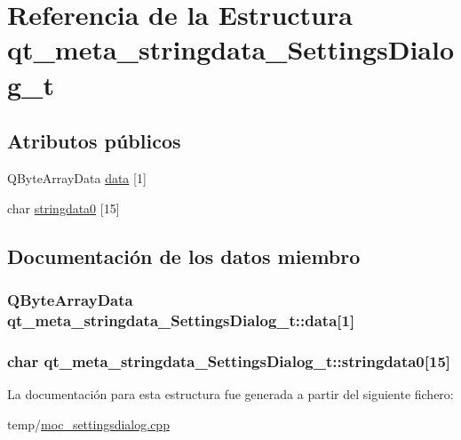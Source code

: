 \hypertarget{structqt__meta__stringdata___settings_dialog__t}{}\section{Referencia de la Estructura qt\+\_\+meta\+\_\+stringdata\+\_\+\+Settings\+Dialog\+\_\+t}
\label{structqt__meta__stringdata___settings_dialog__t}
\subsection*{Atributos públicos}
\begin{DoxyCompactItemize}
\item 
Q\+Byte\+Array\+Data \hyperlink{structqt__meta__stringdata___settings_dialog__t_acd19f421b45861ccbd792760ab6da612}{data} \mbox{[}1\mbox{]}
\item 
char \hyperlink{structqt__meta__stringdata___settings_dialog__t_ae8af4902fefe5a4bfd6e82a2d58d6f45}{stringdata0} \mbox{[}15\mbox{]}
\end{DoxyCompactItemize}


\subsection{Documentación de los datos miembro}
\subsubsection[{\texorpdfstring{data}{data}}]{\setlength{\rightskip}{0pt plus 5cm}Q\+Byte\+Array\+Data qt\+\_\+meta\+\_\+stringdata\+\_\+\+Settings\+Dialog\+\_\+t\+::data\mbox{[}1\mbox{]}}\hypertarget{structqt__meta__stringdata___settings_dialog__t_acd19f421b45861ccbd792760ab6da612}{}\label{structqt__meta__stringdata___settings_dialog__t_acd19f421b45861ccbd792760ab6da612}
\subsubsection[{\texorpdfstring{stringdata0}{stringdata0}}]{\setlength{\rightskip}{0pt plus 5cm}char qt\+\_\+meta\+\_\+stringdata\+\_\+\+Settings\+Dialog\+\_\+t\+::stringdata0\mbox{[}15\mbox{]}}\hypertarget{structqt__meta__stringdata___settings_dialog__t_ae8af4902fefe5a4bfd6e82a2d58d6f45}{}\label{structqt__meta__stringdata___settings_dialog__t_ae8af4902fefe5a4bfd6e82a2d58d6f45}


La documentación para esta estructura fue generada a partir del siguiente fichero\+:\begin{DoxyCompactItemize}
\item 
temp/\hyperlink{moc__settingsdialog_8cpp}{moc\+\_\+settingsdialog.\+cpp}\end{DoxyCompactItemize}
